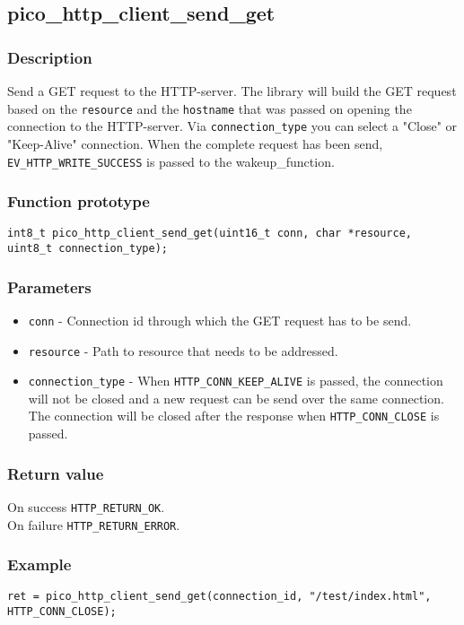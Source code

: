 \subsection{pico\_http\_client\_send\_get}
\subsubsection*{Description}
Send a GET request to the HTTP-server. The library will build the GET request based on the \texttt{resource} and the \texttt{hostname} that was passed on opening the connection to the HTTP-server. Via \texttt{connection\_type} you can select a "Close" or "Keep-Alive" connection. When the complete request has been send, \texttt{EV\_HTTP\_WRITE\_SUCCESS} is passed to the wakeup\_function.

\subsubsection*{Function prototype}
\texttt{int8\_t pico\_http\_client\_send\_get(uint16\_t conn, char *resource, uint8\_t connection\_type);}

\subsubsection*{Parameters}
\begin{itemize}[noitemsep]
\item \texttt{conn} - Connection id through which the GET request has to be send.
\item \texttt{resource} - Path to resource that needs to be addressed.
\item \texttt{connection\_type} - When \texttt{HTTP\_CONN\_KEEP\_ALIVE} is passed, the connection will not be closed and a new request can be send over the same connection. The connection will be closed after the response when \texttt{HTTP\_CONN\_CLOSE} is passed.
\end{itemize}

\subsubsection*{Return value}
On success \texttt{HTTP\_RETURN\_OK}.
\\On failure \texttt{HTTP\_RETURN\_ERROR}.

\subsubsection*{Example}
\begin{verbatim}
ret = pico_http_client_send_get(connection_id, "/test/index.html", HTTP_CONN_CLOSE);
\end{verbatim}

